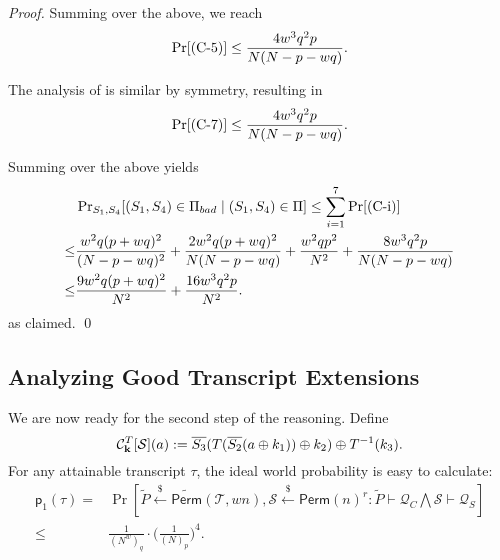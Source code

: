 \begin{proof}
Summing over the above, we reach
%
$$\Pr[\text{(C-5)}]\leq\frac{4w^3q^2p}{N(N-p-wq)}.$$
%

The analysis of \cseven is similar by symmetry, resulting in
%
%
$$\Pr[\text{(C-7)}]\leq\frac{4w^3q^2p}{N(N-p-wq)}.$$
%



\arrangespace


Summing over the above yields
%
\begin{align*}
&  \operatorname{Pr}_{S_1,S_4}[(S_1,S_4) \in \emph{$\Pi_{bad}$}\mid (S_{1}, S_{4})\in\Pi]  \leq \sum_{i=1}^7\Pr[\text{(C-i)}]       \\
\leq  & \frac{w^2 q (p+w q)^{2}}{(N-p-wq)^{2}}+
\frac{2w^2 q (p+w q)^{2}}{N  (N-p-wq)}+
\frac{w^2qp^2}{N^2}+
\frac{8w^3q^2p}{N(N-p-wq)}      \\
\leq  & \frac{9w^2 q (p+w q)^{2}}{N^2}+ \frac{16w^3q^2p}{N^2} .
\end{align*}
%
as claimed.        \qed
\end{proof}











\subsection{Analyzing Good Transcript Extensions}
\label{sec:good-tau-4-rounds}

We are now ready for the second step of the reasoning. Define
%
$$\mathcal{C}_{\mathbf{k}}^T[\mathcal{S}](a):=   \overline{S_3}(T(\overline{S_2}(a\oplus k_1))\oplus k_2)\oplus T^{-1}(k_3).$$
%
For any attainable transcript $\tau$, the ideal world probability is easy to calculate:
%
%
\begin{align*}
\mathsf{p}_{1}(\tau)=&\operatorname{Pr}\left[\widetilde{P} \stackrel{\$}{\leftarrow} \widetilde{{\mathsf{Perm}}}(\mathcal{T}, w n), \mathcal{S} \stackrel{\$}{\leftarrow} \mathsf{Perm}(n)^{r}: \widetilde{P} \vdash \mathcal{Q}_{C} \bigwedge \mathcal{S} \vdash \mathcal{Q}_{S}\right]		\\
\leq&\frac{1}{(N^w)_q}\cdot\bigg(\frac{1}{(N)_p}\bigg)^4.
\end{align*}




